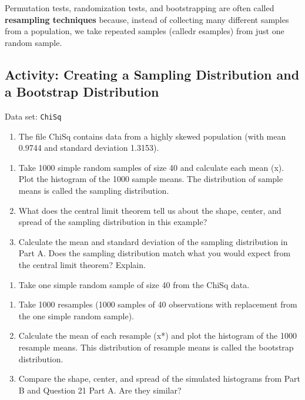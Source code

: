 \documentclass[
]{book}
\providecommand{\tightlist}{%
  \setlength{\itemsep}{0pt}\setlength{\parskip}{0pt}}
\begin{document}
Permutation tests, randomization tests, and bootstrapping are often called \textbf{resampling techniques} because, instead of collecting many different samples from a population, we take repeated samples (calledr esamples) from just one random sample.

\hypertarget{activity-creating-a-sampling-distribution-and-a-bootstrap-distribution}{%
\subsection*{Activity: Creating a Sampling Distribution and a Bootstrap Distribution}\label{activity-creating-a-sampling-distribution-and-a-bootstrap-distribution}}

Data set: \texttt{ChiSq}

\begin{enumerate}
\def\labelenumi{\arabic{enumi}.}
\setcounter{enumi}{20}
\tightlist
\item
  The file ChiSq contains data from a highly skewed population (with mean 0.9744 and standard
  deviation 1.3153).
\end{enumerate}

\begin{enumerate}
\def\labelenumi{\alph{enumi}.}
\tightlist
\item
  Take 1000 simple random samples of size 40 and calculate each mean (x). Plot the histogram of the 1000 sample means. The distribution of sample means is called the sampling distribution.
\item
  What does the central limit theorem tell us about the shape, center, and spread of the sampling distribution in this example?
\item
  Calculate the mean and standard deviation of the sampling distribution in Part A. Does the sampling distribution match what you would expect from the central limit theorem? Explain.
\end{enumerate}

\begin{enumerate}
\def\labelenumi{\arabic{enumi}.}
\setcounter{enumi}{21}
\tightlist
\item
  Take one simple random sample of size 40 from the ChiSq data.
\end{enumerate}

\begin{enumerate}
\def\labelenumi{\alph{enumi}.}
\tightlist
\item
  Take 1000 resamples (1000 samples of 40 observations with replacement from the one simple random sample).
\item
  Calculate the mean of each resample (x*) and plot the histogram of the 1000 resample means. This distribution of resample means is called the bootstrap distribution.
\item
  Compare the shape, center, and spread of the simulated histograms from Part B and Question 21 Part A. Are they similar?
\end{enumerate}
\end{document}
